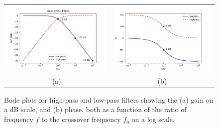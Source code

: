 \begin{figure}[htbp]
\begin{center}
\begin{tabular}{cc}
\includegraphics[height=0.22\textheight]{figs/labs/filters/rcgaindb.pdf}
&
\includegraphics[height=0.22\textheight]{figs/labs/filters/rcphase.pdf} \\
(a) & (b) \\
\end{tabular}
\end{center}
\caption{\label{fig:bode} Bode plots for high-pass and low-pass filters showing the (a) gain on a dB scale, and (b) phase, both as a function of the ratio of frequency $f$ to the crossover frequency $f_0$ on a log scale.}
\end{figure}


